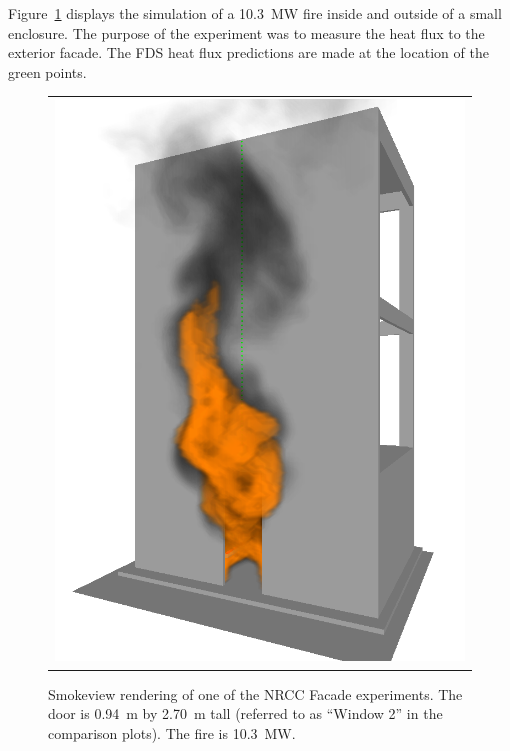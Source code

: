 Figure~\ref{NRCC_Facade_Image} displays the simulation of a 10.3~MW fire inside and outside of a small enclosure. The purpose of the experiment was to measure the heat flux to the exterior facade. The FDS heat flux predictions are made at the location of the green points.

\begin{figure}[h!]
\begin{center}
\begin{tabular}{c}
\includegraphics[width=5.0in]{FIGURES/NRCC_Facade/NRCC_Facade_Win_2_10_MW_0467}
\end{tabular}
\end{center}
\caption[Smokeview rendering of NRCC Facade experiment]
{Smokeview rendering of one of the NRCC Facade experiments. The door is
0.94~m by 2.70~m tall (referred to as ``Window 2'' in the comparison plots). The
fire is 10.3~MW.}
\label{NRCC_Facade_Image}
\end{figure}

\newpage

